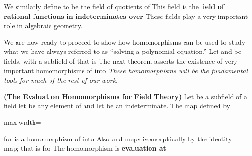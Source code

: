 \documentclass[11pt,oneside]{article}
\begin{document}
\BookNarrativetrue

\begin{BookBody}

\noindent {} We similarly define  to be the field of quotients of  This field  is the\textbf{ field of rational functions in}  \textbf{indeterminates over}  These fields play a very important role in algebraic geometry.


\noindent We are now ready to proceed to show how homomorphisms can be used to study what we have always referred to as “solving a polynomial equation.” Let  and  be fields, with  a subfield of  that is The next theorem asserts the existence of very important homomorphisms of  into  \textit{These homomorphisms will be the fundamental} \textit{tools for much of the rest of our work}.

 \textbf{(The Evaluation Homomorphisms for Field Theory)} Let  be a subfield of a field  let \BookInline{\alpha } be any element of  and let  be an indeterminate. The map  defined by

\begin{center}\begin{adjustbox}{max width=\linewidth}\end{adjustbox}\end{center}

\noindent for  is a homomorphism of  into  Also and \BookInline{\phi _{\alpha }} maps  isomorphically by the identity map; that is for  The homomorphism \BookInline{\phi _{\alpha }} is\textbf{ evaluation at} 


\end{BookBody}
\end{document}
